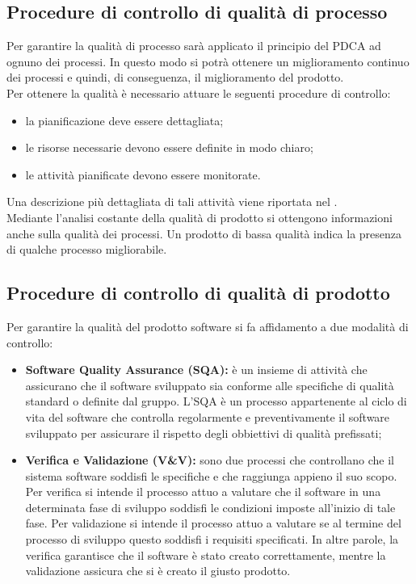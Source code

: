 	\subsection{Procedure di controllo di qualità di processo}
	Per garantire la qualità di processo sarà applicato il principio del PDCA ad ognuno dei processi. In questo modo si potrà ottenere un miglioramento continuo dei processi e quindi, di conseguenza, il miglioramento del prodotto.\\
	Per ottenere la qualità è necessario attuare le seguenti procedure di controllo:
		\begin{itemize}
			\item la pianificazione deve essere dettagliata;
			\item le risorse necessarie devono essere definite in modo chiaro;
			\item le attività pianificate devono essere monitorate.
		\end{itemize}
	Una descrizione più dettagliata di tali attività viene riportata nel \docNameVersionPdP.\\
	Mediante l'analisi costante della qualità di prodotto si ottengono informazioni anche sulla qualità dei processi. Un prodotto di bassa qualità indica la presenza di qualche processo migliorabile.
	
	\subsection{Procedure di controllo di qualità di prodotto}
	Per garantire la qualità del prodotto software si fa affidamento a due modalità di controllo:
		\begin{itemize}
			\item \textbf{Software Quality Assurance (SQA):} è un insieme di attività che assicurano che il software sviluppato sia conforme alle specifiche di qualità standard o definite dal gruppo. L'SQA è un processo appartenente al ciclo di vita del software che controlla regolarmente e preventivamente il software sviluppato per assicurare il rispetto degli obbiettivi di qualità prefissati;
			\item \textbf{Verifica e Validazione (V\&V):} sono due processi che controllano che il sistema software soddisfi le specifiche e che raggiunga appieno il suo scopo.\\
			Per verifica si intende il processo attuo a valutare che il software in una determinata fase di sviluppo soddisfi le condizioni imposte all'inizio di tale fase. Per validazione si intende il processo attuo a valutare se al termine del processo di sviluppo questo soddisfi i requisiti specificati. In altre parole, la verifica garantisce che il software è stato creato correttamente, mentre la validazione assicura che si è creato il giusto prodotto.
		\end{itemize}
	
